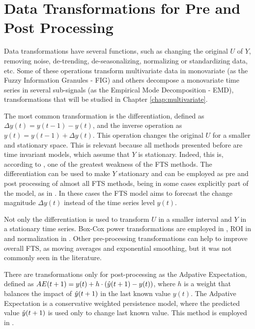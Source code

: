 \section{Data Transformations for Pre and Post Processing}
\label{sec:fts_transformations}


Data transformations have several functions, such as changing the original $U$ of $Y$, removing noise, de-trending, de-seasonalizing, normalizing or standardizing data, etc. Some of these operations transform multivariate data in monovariate (as the Fuzzy Information Granules - FIG) and others decompose a monovariate time series in several sub-signals (as the Empirical Mode Decomposition - EMD), transformations that will be studied in Chapter \ref{chap:multivariate}.

The most common transformation is the differentiation, defined as $\Delta y(t) = y(t-1) - y(t)$, and the inverse operation as $y(t) = y(t-1) + \Delta y(t)$. This operation changes the original $U$ for a smaller and stationary space. This is relevant because all methods presented before are time invariant models, which assume that $Y$ is stationary. Indeed, this is, according to \cite{Duru2012}, one of the greatest weakness of the FTS methods. The differentiation can be used to make $Y$ stationary and can be employed as pre and post processing of almost all FTS methods, being in some cases explicitly part of the model, as in \cite{Cheng2011, Lee2011, Sadaei2016}. In these cases the FTS model aims to forecast the change magnitude $\Delta y(t)$ instead of the time series level $y(t)$.

Not only the differentiation is used to transform $U$ in a smaller interval and $Y$ in a stationary time series. Box-Cox power transformations are employed in  \citep{Lee2013}, ROI in \cite{Sadaei2014a, Moyse2016} and normalization in \cite{Tran2018}. Other pre-processing transformations can help to improve overall FTS, as moving averages and exponential smoothing, but it was not commonly seen in the literature. 

There are transformations only for post-processing as the Adpative Expectation, defined as $AE(t+1) = y(t) + h\cdot(\hat{y}(t+1) - y(t))$, where $h$ is a weight that balances the impact of $\hat{y}(t+1)$ in the last known value $y(t)$. The Adpative Expectation is a conservative weighted persistence model, where the predicted value $\hat{y}(t+1)$ is used only to change last known value. This method is employed in \cite{Cheng2008, Huang2011, Enayatifar2013, sadaei2014short, Singh2015, Sadaei2016, Ye2016, Yang2017, Bose2017}.


